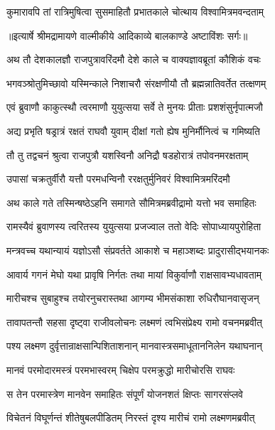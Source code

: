 \twolineshloka
{कुमारावपि तां रात्रिमुषित्वा सुसमाहितौ}
{प्रभातकाले चोत्थाय विश्वामित्रमवन्दताम्} %


{॥इत्यार्षे श्रीमद्रामायणे वाल्मीकीये आदिकाव्ये बालकाण्डे अष्टाविंशः सर्गः॥}


\twolineshloka
{अथ तौ देशकालज्ञौ राजपुत्रावरिंदमौ}
{देशे काले च वाक्यज्ञावब्रूतां कौशिकं वचः} %

\twolineshloka
{भगवञ्श्रोतुमिच्छावो यस्मिन्काले निशाचरौ}
{संरक्षणीयौ तौ ब्रह्मन्नातिवर्तेत तत्क्षणम्} %

\twolineshloka
{एवं ब्रुवाणौ काकुत्स्थौ त्वरमाणौ युयुत्सया}
{सर्वे ते मुनयः प्रीताः प्रशशंसुर्नृपात्मजौ} %

\twolineshloka
{अद्य प्रभृति षड्रात्रं रक्षतं राघवौ युवाम्}
{दीक्षां गतो ह्येष मुनिर्मौनित्वं च गमिष्यति} %

\twolineshloka
{तौ तु तद्वचनं श्रुत्वा राजपुत्रौ यशस्विनौ}
{अनिद्रौ षडहोरात्रं तपोवनमरक्षताम्} %

\twolineshloka
{उपासां चक्रतुर्वीरौ यत्तौ परमधन्विनौ}
{ररक्षतुर्मुनिवरं विश्वामित्रमरिंदमौ} %

\twolineshloka
{अथ काले गते तस्मिन्षष्ठेऽहनि समागते}
{सौमित्रमब्रवीद्रामो यत्तो भव समाहितः} %

\twolineshloka
{रामस्यैवं ब्रुवाणस्य त्वरितस्य युयुत्सया}
{प्रजज्वाल ततो वेदिः सोपाध्यायपुरोहिता} %

\twolineshloka
{मन्त्रवच्च यथान्यायं यज्ञोऽसौ संप्रवर्तते}
{आकाशे च महाञ्शब्दः प्रादुरासीद्भयानकः} %

\twolineshloka
{आवार्य गगनं मेघो यथा प्रावृषि निर्गतः}
{तथा मायां विकुर्वाणौ राक्षसावभ्यधावताम्} %

\twolineshloka
{मारीचश्च सुबाहुश्च तयोरनुचरास्तथा}
{आगम्य भीमसंकाशा रुधिरौघानवासृजन्} %

\twolineshloka
{तावापतन्तौ सहसा दृष्ट्वा राजीवलोचनः}
{लक्ष्मणं त्वभिसंप्रेक्ष्य रामो वचनमब्रवीत्} %

\twolineshloka
{पश्य लक्ष्मण दुर्वृत्तान्राक्षसान्पिशिताशनान्}
{मानवास्त्रसमाधूताननिलेन यथाघनान्} %

\twolineshloka
{मानवं परमोदारमस्त्रं परमभास्वरम्}
{चिक्षेप परमक्रुद्धो मारीचोरसि राघवः} %

\twolineshloka
{स तेन परमास्त्रेण मानवेन समाहितः}
{संपूर्णं योजनशतं क्षिप्तः सागरसंप्लवे} %

\twolineshloka
{विचेतनं विघूर्णन्तं शीतेषुबलपीडितम्}
{निरस्तं दृश्य मारीचं रामो लक्ष्मणमब्रवीत्} %

